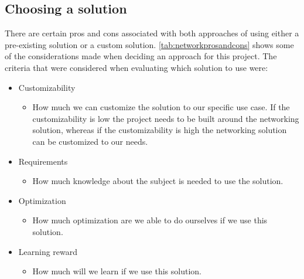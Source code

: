 \subsection{Choosing a solution}
There are certain pros and cons associated with both approaches of using either a pre-existing solution or a custom solution.
\autoref{tab:networkprosandcons} shows some of the considerations made when deciding an approach for this project.
The criteria that were considered when evaluating which solution to use were:
\begin{itemize}
    \item Customizability
        \begin{itemize}
            \item How much we can customize the solution to our specific use case. If the customizability is low the project needs to be built around the networking solution, whereas if the customizability is high the networking solution can be customized to our needs.
        \end{itemize}
    \item Requirements
        \begin{itemize}
            \item How much knowledge about the subject is needed to use the solution.
        \end{itemize}
    \item Optimization
        \begin{itemize}
            \item How much optimization are we able to do ourselves if we use this solution.
        \end{itemize}
    \item Learning reward
        \begin{itemize}
            \item How much will we learn if we use this solution.
        \end{itemize}
\end{itemize}

